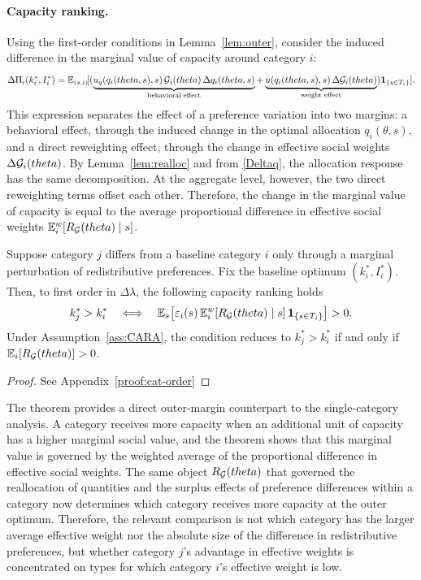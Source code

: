 \documentclass{class}
\begin{document}
\paragraph{Capacity ranking.} 
Using the first-order conditions in Lemma~\ref{lem:outer}, consider the induced difference in the marginal value of capacity around category \(i\):
\[
\Delta \Pi_i(k_i^\ast,I_i^\ast)
=
\mathbb{E}_{(s,i)}\![
(
\underbrace{u_q(q_i(theta,s),s)\,\mathcal{G}_i(theta)\,\Delta q_i(theta,s)
}_{\text{behavioral effect}}+
\underbrace{u(q_i(theta,s),s)\,\Delta \mathcal{G}_i(theta)}_{\text{weight effect}}
)
\mathbf{1}_{\{s\in T_i\}}
].
\]
This expression separates the effect of a preference variation into two margins: a behavioral effect, through the induced change in the optimal allocation \(q_i(\theta,s)\), and a direct reweighting effect, through the change in effective social weights \(\Delta \mathcal{G}_i(theta)\). By Lemma~\ref{lem:realloc} and from \ref{Deltaq}, the allocation response has the same decomposition. At the aggregate level, however, the two direct reweighting terms offset each other. Therefore, the change in the marginal value of capacity is equal to the average proportional difference in effective social weights $\mathbb{E}_i^w\!\left[R_{\mathcal{G}}(theta)\mid s\right]$.

\begin{theorem}\label{thm:cat-order}
Suppose category \(j\) differs from a baseline category \(i\) only through a marginal perturbation of redistributive preferences. Fix the baseline optimum \((k_i^\ast,I_i^\ast)\). Then, to first order in \(\Delta\lambda\), the following capacity ranking holds
\[
k_j^\ast>k_i^\ast
\quad\Longleftrightarrow\quad
\mathbb{E}_s\!\left[
\varepsilon_i(s)\,
\mathbb{E}_i^w\!\left[R_{\mathcal{G}}(theta)\mid s\right]
\mathbf{1}_{\{s\in T_i\}}
\right]>0.
\]
Under Assumption~\ref{ass:CARA}, the condition reduces to $k_j^\ast>k_i^\ast$ if and only if $\mathbb{E}_i[R_{\mathcal{G}}(theta)]>0$. 
\end{theorem}
\begin{proof}
    See Appendix~\ref{proof:cat-order}
\end{proof}

The theorem provides a direct outer-margin counterpart to the single-category analysis. A category receives more capacity when an additional unit of capacity has a higher marginal social value, and the theorem shows that this marginal value is governed by the weighted average of the proportional difference in effective social weights. The same object \(R_{\mathcal{G}}(theta)\) that governed the reallocation of quantities and the surplus effects of preference differences within a category now determines which category receives more capacity at the outer optimum. Therefore, the relevant comparison is not which category has the larger average effective weight nor the absolute size of the difference in redistributive preferences, but whether category \(j\)'s advantage in effective weights is concentrated on types for which category \(i\)'s effective weight is low.
\end{document}
